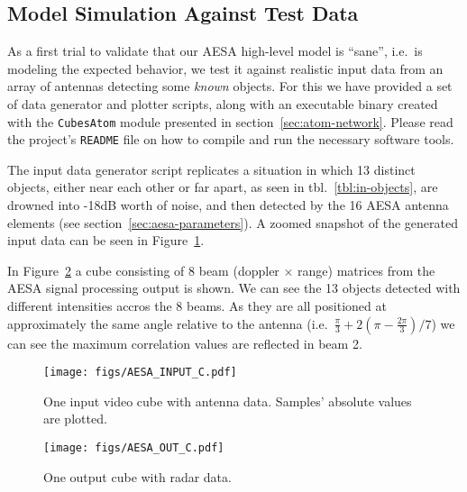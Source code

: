 \documentclass[
  a4paper,
]{article}
\newcommand{\nopandoc}[1]{#1}
\begin{document}
\hypertarget{sec:atom-sim}{%
\subsection{Model Simulation Against Test Data}\label{sec:atom-sim}}

As a first trial to validate that our AESA high-level model is ``sane'',
i.e.~is modeling the expected behavior, we test it against realistic
input data from an array of antennas detecting some \emph{known}
objects. For this we have provided a set of data generator and plotter
scripts, along with an executable binary created with the
\texttt{CubesAtom} module presented in section~\ref{sec:atom-network}.
Please read the project's \texttt{README} file on how to compile and run
the necessary software tools.

The input data generator script replicates a situation in which 13
distinct objects, either near each other or far apart, as seen in
tbl.~\ref{tbl:in-objects}, are drowned into -18dB worth of noise, and
then detected by the 16 AESA antenna elements (see
section~\ref{sec:aesa-parameters}). A zoomed snapshot of the generated
input data can be seen in Figure~\ref{fig:aesa-indata}.

In Figure~\ref{fig:aesa-odata-atom} a cube consisting of 8 beam (doppler
\(\times\) range) matrices from the AESA signal processing output is
shown. We can see the 13 objects detected with different intensities
accros the 8 beams. As they are all positioned at approximately the same
angle relative to the antenna
(i.e.~\(\frac{\pi}{3} + 2(\pi-\frac{2\pi}{3})/7\)) we can see the
maximum correlation values are reflected in beam 2.

\nopandoc{\begin{landscape}}

\begin{figure}
\hypertarget{fig:aesa-indata}{%
\centering
\texttt{[image: figs/AESA\_INPUT\_C.pdf]}
\caption{One input video cube with antenna data. Samples' absolute
values are plotted.}\label{fig:aesa-indata}
}
\end{figure}

\begin{figure}
\hypertarget{fig:aesa-odata-atom}{%
\centering
\texttt{[image: figs/AESA\_OUT\_C.pdf]}
\caption{One output cube with radar data.}\label{fig:aesa-odata-atom}
}
\end{figure}

\nopandoc{\end{landscape}}
\end{document}
